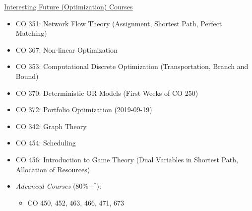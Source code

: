 \underline{Interesting Future (Optimization) Courses}
\begin{itemize}
    \item CO 351: Network Flow Theory (Assignment, Shortest Path, Perfect Matching)
    \item CO 367: Non-linear Optimization
    \item CO 353: Computational Discrete Optimization (Transportation, Branch and Bound)
    \item CO 370: Deterministic OR Models (First Weeks of CO 250)
    \item CO 372: Portfolio Optimization (2019-09-19)
    \item CO 342: Graph Theory
    \item CO 454: Scheduling
    \item CO 456: Introduction to Game Theory (Dual Variables in Shortest Path, Allocation of Resources)
    \item \emph{Advanced Courses} ($ 80\%+^* $):
          \begin{itemize}
              \item CO 450, 452, 463, 466, 471, 673
          \end{itemize}
\end{itemize}

